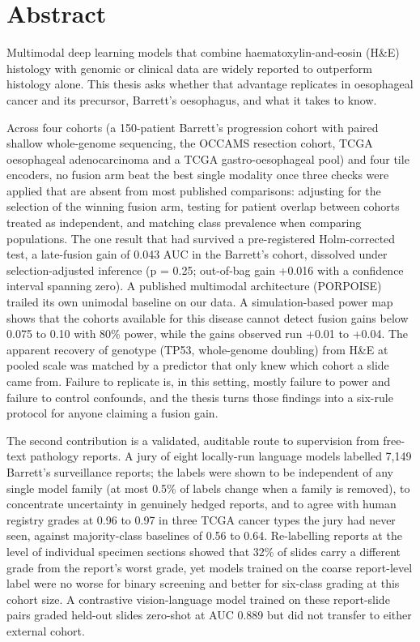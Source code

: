\chapter*{Abstract}

Multimodal deep learning models that combine haematoxylin-and-eosin (H\&E) histology with genomic or clinical data are widely reported to outperform histology alone. This thesis asks whether that advantage replicates in oesophageal cancer and its precursor, Barrett's oesophagus, and what it takes to know.

Across four cohorts (a 150-patient Barrett's progression cohort with paired shallow whole-genome sequencing, the OCCAMS resection cohort, TCGA oesophageal adenocarcinoma and a TCGA gastro-oesophageal pool) and four tile encoders, no fusion arm beat the best single modality once three checks were applied that are absent from most published comparisons: adjusting for the selection of the winning fusion arm, testing for patient overlap between cohorts treated as independent, and matching class prevalence when comparing populations. The one result that had survived a pre-registered Holm-corrected test, a late-fusion gain of 0.043 AUC in the Barrett's cohort, dissolved under selection-adjusted inference (p = 0.25; out-of-bag gain +0.016 with a confidence interval spanning zero). A published multimodal architecture (PORPOISE) trailed its own unimodal baseline on our data. A simulation-based power map shows that the cohorts available for this disease cannot detect fusion gains below 0.075 to 0.10 with 80\% power, while the gains observed run +0.01 to +0.04. The apparent recovery of genotype (TP53, whole-genome doubling) from H\&E at pooled scale was matched by a predictor that only knew which cohort a slide came from. Failure to replicate is, in this setting, mostly failure to power and failure to control confounds, and the thesis turns those findings into a six-rule protocol for anyone claiming a fusion gain.

The second contribution is a validated, auditable route to supervision from free-text pathology reports. A jury of eight locally-run language models labelled 7,149 Barrett's surveillance reports; the labels were shown to be independent of any single model family (at most 0.5\% of labels change when a family is removed), to concentrate uncertainty in genuinely hedged reports, and to agree with human registry grades at 0.96 to 0.97 in three TCGA cancer types the jury had never seen, against majority-class baselines of 0.56 to 0.64. Re-labelling reports at the level of individual specimen sections showed that 32\% of slides carry a different grade from the report's worst grade, yet models trained on the coarse report-level label were no worse for binary screening and better for six-class grading at this cohort size. A contrastive vision-language model trained on these report-slide pairs graded held-out slides zero-shot at AUC 0.889 but did not transfer to either external cohort.

